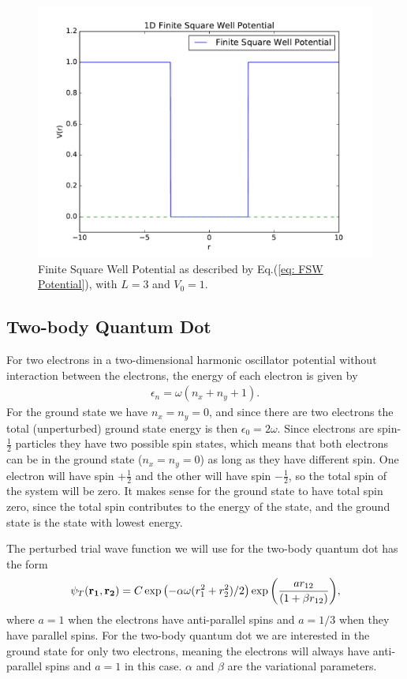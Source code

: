 \documentclass[../main.tex]{subfiles}
\begin{document}
\begin{figure}[!ht]
    \centering
    \includegraphics[scale=0.7]{figures/FSW_Potential}
    \caption{Finite Square Well Potential as described by Eq.(\ref{eq: FSW Potential}), with $L = 3$ and $V_0 = 1$.}
    \label{fig: FSW Potential}
\end{figure}


\subsection{Two-body Quantum Dot}
For two electrons in a two-dimensional harmonic oscillator potential without interaction between the electrons, the energy of each electron is given by
\begin{align}\label{eq: unperturbedEnergy}
    \epsilon_n = \omega(n_x + n_y + 1).
\end{align}
For the ground state we have $n_x=n_y=0$, and since there are two electrons the total (unperturbed) ground state energy is then $\epsilon_0 = 2\omega$. Since electrons are spin-$\frac{1}{2}$ particles they have two possible spin states, which means that both electrons can be in the ground state ($n_x=n_y=0$) as long as they have different spin. One electron will have spin $+\frac{1}{2}$ and the other will have spin $-\frac{1}{2}$, so the total spin of the system will be zero. It makes sense for the ground state to have total spin zero, since the total spin contributes to the energy of the state, and the ground state is the state with lowest energy.

The perturbed trial wave function we will use for the two-body quantum dot has the form 
\begin{align}
    \psi_{T}({\bf r_1},{\bf r_2}) = 
   C\exp{\left(-\alpha\omega(r_1^2+r_2^2)/2\right)}
   \exp{\left(\frac{ar_{12}}{(1+\beta r_{12})}\right)},
\end{align}
where $a=1$ when the electrons have anti-parallel spins and $a=1/3$ when they have parallel spins. For the two-body quantum dot we are interested in the ground state for only two electrons, meaning the electrons will always have anti-parallel spins and $a=1$ in this case. $\alpha$ and $\beta$ are the variational parameters.
\end{document}
